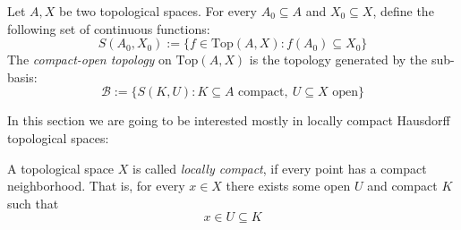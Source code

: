 \begin{definition} Let $A,X$ be two topological spaces. For every $A_0\subseteq A$ and $X_0\subseteq X$, define the following set of continuous functions:
\[S(A_0,X_0):=\big\{f\in\mathrm{Top}(A,X):f(A_0)\subseteq X_0\big\}\]
The \emph{compact-open topology} on $\mathrm{Top}(A,X)$ is the topology generated by the sub-basis:
\[\mathcal{B}:=\big\{S(K,U):K\subseteq A\text{ compact},\ U\subseteq X\text{ open}\big\}\]
\end{definition}

In this section we are going to be interested mostly in locally compact Hausdorff topological spaces:
\begin{definition} A topological space $X$ is called \emph{locally compact}, if every point has a compact neighborhood. That is, for every $x\in X$ there exists some open $U$ and compact $K$ such that
\[x\in U\subseteq K\]
\end{definition}

